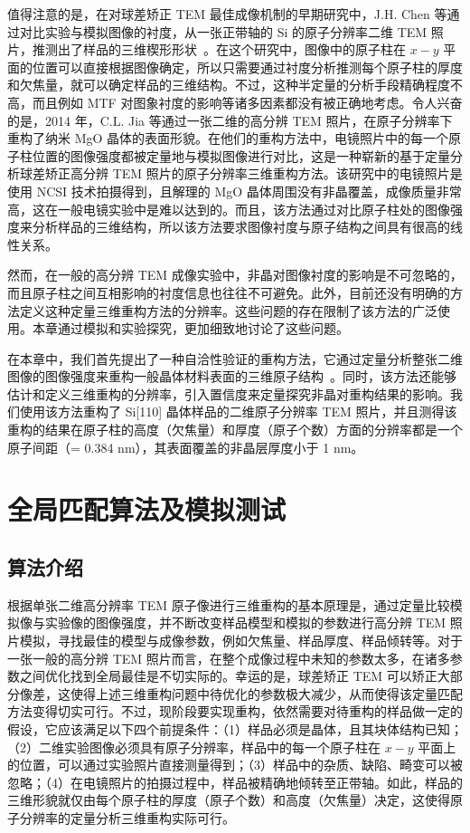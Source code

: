 值得注意的是，在对球差矫正 TEM 最佳成像机制的早期研究中，J.H. Chen 等通过对比实验与模拟图像的衬度，从一张正带轴的 Si 的原子分辨率二维 TEM 照片，推测出了样品的三维楔形形状~\cite{Chen2004}。在这个研究中，图像中的原子柱在 $x-y$ 平面的位置可以直接根据图像确定，所以只需要通过衬度分析推测每个原子柱的厚度和欠焦量，就可以确定样品的三维结构。不过，这种半定量的分析手段精确程度不高，而且例如 MTF 对图象衬度的影响等诸多因素都没有被正确地考虑。令人兴奋的是，2014 年，C.L. Jia 等通过一张二维的高分辨 TEM 照片，在原子分辨率下重构了纳米 MgO 晶体的表面形貌。在他们的重构方法中，电镜照片中的每一个原子柱位置的图像强度都被定量地与模拟图像进行对比，这是一种崭新的基于定量分析球差矫正高分辨 TEM 照片的原子分辨率三维重构方法。该研究中的电镜照片是使用 NCSI 技术拍摄得到，且解理的 MgO 晶体周围没有非晶覆盖，成像质量非常高，这在一般电镜实验中是难以达到的。而且，该方法通过对比原子柱处的图像强度来分析样品的三维结构，所以该方法要求图像衬度与原子结构之间具有很高的线性关系。

然而，在一般的高分辨 TEM 成像实验中，非晶对图像衬度的影响是不可忽略的，而且原子柱之间互相影响的衬度信息也往往不可避免。此外，目前还没有明确的方法定义这种定量三维重构方法的分辨率。这些问题的存在限制了该方法的广泛使用。本章通过模拟和实验探究，更加细致地讨论了这些问题。

在本章中，我们首先提出了一种自洽性验证的重构方法，它通过定量分析整张二维图像的图像强度来重构一般晶体材料表面的三维原子结构~\cite{SRH2019}。同时，该方法还能够估计和定义三维重构的分辨率，引入置信度来定量探究非晶对重构结果的影响。我们使用该方法重构了 Si[110] 晶体样品的二维原子分辨率 TEM 照片，并且测得该重构的结果在原子柱的高度（欠焦量）和厚度（原子个数）方面的分辨率都是一个原子间距（= 0.384 nm），其表面覆盖的非晶层厚度小于 1 nm。

\section{全局匹配算法及模拟测试}
\subsection{算法介绍}
根据单张二维高分辨率 TEM 原子像进行三维重构的基本原理是，通过定量比较模拟像与实验像的图像强度，并不断改变样品模型和模拟的参数进行高分辨 TEM 照片模拟，寻找最佳的模型与成像参数，例如欠焦量、样品厚度、样品倾转等。对于一张一般的高分辨 TEM 照片而言，在整个成像过程中未知的参数太多，在诸多参数之间优化找到全局最佳是不切实际的。幸运的是，球差矫正 TEM 可以矫正大部分像差，这使得上述三维重构问题中待优化的参数极大减少，从而使得该定量匹配方法变得切实可行。不过，现阶段要实现重构，依然需要对待重构的样品做一定的假设，它应该满足以下四个前提条件：（1）样品必须是晶体，且其块体结构已知；（2）二维实验图像必须具有原子分辨率，样品中的每一个原子柱在 $x-y$ 平面上的位置，可以通过实验照片直接测量得到；（3）样品中的杂质、缺陷、畸变可以被忽略；（4）在电镜照片的拍摄过程中，样品被精确地倾转至正带轴。如此，样品的三维形貌就仅由每个原子柱的厚度（原子个数）和高度（欠焦量）决定，这使得原子分辨率的定量分析三维重构实际可行。

